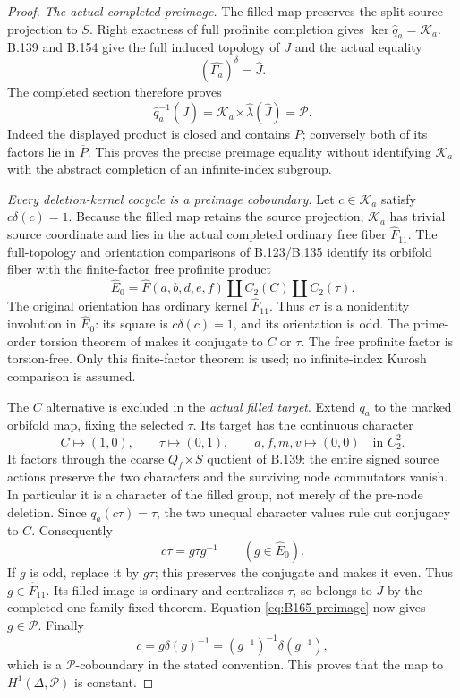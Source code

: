 \begin{proof}
\emph{The actual completed preimage.}
The filled map preserves the split source projection to \(S\).
Right exactness of full profinite completion gives
\(\ker\widehat q_a=\mathcal K_a\).
B.139 and B.154 give the full induced topology of \(J\) and the
actual equality
\[
 (\widehat{\Gamma_a})^\delta=\widehat J.
\]
The completed section therefore proves
\begin{equation}\label{eq:B165-preimage}
 \widehat q_a^{-1}(\widehat J)
   =\mathcal K_a\rtimes\widehat\lambda(\widehat J)
   =\mathcal P.
\end{equation}
Indeed the displayed product is closed and contains \(P\);
conversely both of its factors lie in \(\overline P\).
This proves the precise preimage equality without identifying
\(\mathcal K_a\) with the abstract completion of an infinite-index
subgroup.

\emph{Every deletion-kernel cocycle is a preimage coboundary.}
Let \(c\in\mathcal K_a\) satisfy \(c\delta(c)=1\).
Because the filled map retains the source projection, \(\mathcal K_a\)
has trivial source coordinate and lies in the actual completed
ordinary free fiber \(\widehat F_{11}\).
The full-topology and orientation comparisons of B.123/B.135 identify
its orbifold fiber with the finite-factor free profinite product
\begin{equation}\label{eq:B165-fiber}
 \widehat E_0
 =\widehat F(a,b,d,e,f)\amalg C_2(C)\amalg C_2(\tau).
\end{equation}
The original orientation has ordinary kernel \(\widehat F_{11}\).
Thus \(c\tau\) is a nonidentity involution in \(\widehat E_0\):
its square is \(c\delta(c)=1\), and its orientation is odd.
The prime-order torsion theorem of
\citet[Theorem A\(^{\prime}\)]{A_HR1985} makes it conjugate
to \(C\) or \(\tau\). The free profinite factor is torsion-free.
Only this finite-factor theorem is used; no infinite-index Kurosh
comparison is assumed.

The \(C\) alternative is excluded in the \emph{actual filled target}.
Extend \(q_a\) to the marked orbifold map, fixing the selected
\(\tau\). Its target has the continuous character
\[
 C\longmapsto(1,0),\qquad \tau\longmapsto(0,1),
 \qquad a,f,m,v\longmapsto(0,0)
 \quad\text{in }C_2^2.
\]
It factors through the coarse \(Q_f\rtimes S\) quotient of B.139:
the entire signed source actions preserve the two characters and
the surviving node commutators vanish. In particular it is a
character of the filled group, not merely of the pre-node deletion.
Since \(q_a(c\tau)=\tau\), the two unequal character values rule
out conjugacy to \(C\). Consequently
\[
                         c\tau=g\tau g^{-1}
                         \qquad(g\in\widehat E_0).
\]
If \(g\) is odd, replace it by \(g\tau\); this preserves the conjugate
and makes it even. Thus \(g\in\widehat F_{11}\).
Its filled image is ordinary and centralizes \(\tau\), so belongs
to \(\widehat J\) by the completed one-family fixed theorem.
Equation \eqref{eq:B165-preimage} now gives \(g\in\mathcal P\).
Finally
\[
 c=g\delta(g)^{-1}=(g^{-1})^{-1}\delta(g^{-1}),
\]
which is a \(\mathcal P\)-coboundary in the stated convention.
This proves that the map to \(H^1(\Delta,\mathcal P)\) is constant.


\end{proof}
